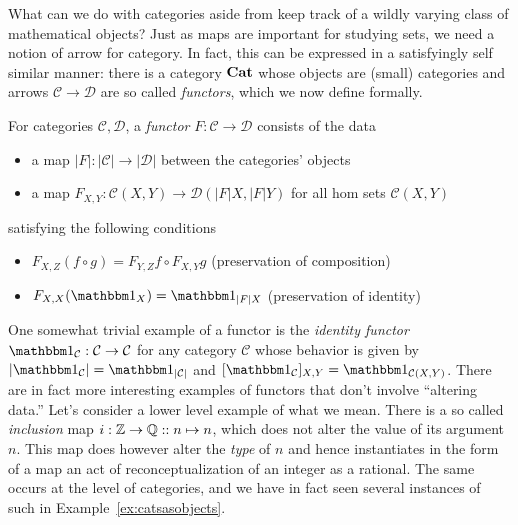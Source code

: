 What can we do with categories aside from keep track of a wildly varying class of mathematical objects? Just as maps are important for studying sets, we need a notion of arrow for category. In fact, this can be expressed in a satisfyingly self similar manner: there is a category $\mathbf{Cat}$ whose objects are (small) categories and arrows $\mathcal{C}\to\mathcal{D}$ are so called \emph{functors}, which we now define formally.

\begin{dfn}
For categories $\mathcal{C},\mathcal{D}$, a \emph{functor} $F:\mathcal{C}\to\mathcal{D}$ consists of the data
\begin{itemize}
\item a map $|F|:|\mathcal{C}|\to|\mathcal{D}|$ between the categories' objects
\item a map $F_{X,Y}:\mathcal{C}(X,Y)\to\mathcal{D}(|F|X,|F|Y)$ for all hom sets $\mathcal{C}(X,Y)$
\end{itemize}
satisfying the following conditions
\begin{itemize}
\item $F_{X,Z}(f\circ g) = F_{Y,Z}f\circ F_{X,Y}g$ (preservation of composition)
\item $F_{X,X}(\Id{X}) = \Id{|F|X}$ (preservation of identity)
\end{itemize}
\end{dfn}
One somewhat trivial example of a functor is the \emph{identity functor} $\Id{\mathcal{C}}:\mathcal{C}\to\mathcal{C}$ for any category $\mathcal{C}$ whose behavior is given by $|\Id{\mathcal{C}}|=\Id{|\mathcal{C}|}$ and $[\Id{\mathcal{C}}]_{X,Y}=\Id{\mathcal{C}(X,Y)}$. There are in fact more interesting examples of functors that don't involve ``altering data.'' Let's consider a lower level example of what we mean. There is a so called \emph{inclusion} map $i:\mathbb Z\to\mathbb Q::n\mapsto n$, which does not alter the value of its argument $n$. This map does however alter the \emph{type} of $n$ and hence instantiates in the form of a map an act of reconceptualization of an integer as a rational. The same occurs at the level of categories, and we have in fact seen several instances of such in Example~\ref{ex:catsasobjects}. 

